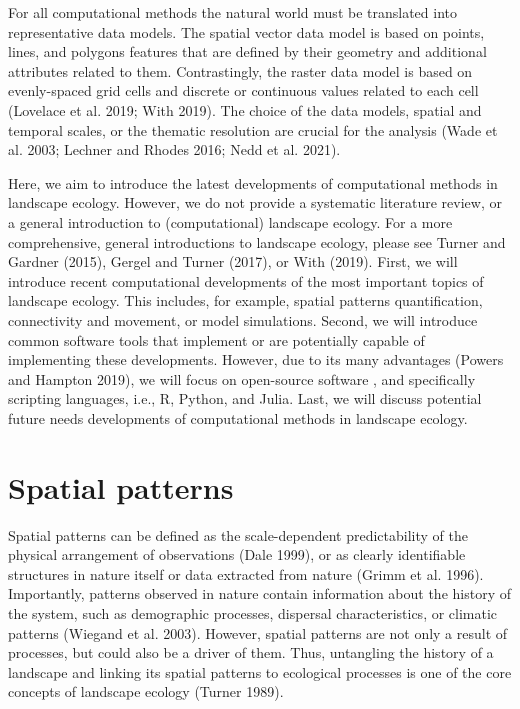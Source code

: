 \documentclass[
  10pt,
  a4paperpaper,
]{article}
\begin{document}
For all computational methods the natural world must be translated into
representative data models. The spatial vector data model is based on
points, lines, and polygons features that are defined by their geometry
and additional attributes related to them. Contrastingly, the raster
data model is based on evenly-spaced grid cells and discrete or
continuous values related to each cell (Lovelace et al. 2019; With
2019). The choice of the data models, spatial and temporal scales, or
the thematic resolution are crucial for the analysis (Wade et al. 2003;
Lechner and Rhodes 2016; Nedd et al. 2021).

Here, we aim to introduce the latest developments of computational
methods in landscape ecology. However, we do not provide a systematic
literature review, or a general introduction to (computational)
landscape ecology. For a more comprehensive, general introductions to
landscape ecology, please see Turner and Gardner (2015), Gergel and
Turner (2017), or With (2019). First, we will introduce recent
computational developments of the most important topics of landscape
ecology. This includes, for example, spatial patterns quantification,
connectivity and movement, or model simulations. Second, we will
introduce common software tools that implement or are potentially
capable of implementing these developments. However, due to its many
advantages (Powers and Hampton 2019), we will focus on open-source
software , and specifically scripting languages, i.e., R, Python, and
Julia. Last, we will discuss potential future needs developments of
computational methods in landscape ecology.

\section{Spatial patterns}\label{spatial-patterns}

Spatial patterns can be defined as the scale-dependent predictability of
the physical arrangement of observations (Dale 1999), or as clearly
identifiable structures in nature itself or data extracted from nature
(Grimm et al. 1996). Importantly, patterns observed in nature contain
information about the history of the system, such as demographic
processes, dispersal characteristics, or climatic patterns (Wiegand et
al. 2003). However, spatial patterns are not only a result of processes,
but could also be a driver of them. Thus, untangling the history of a
landscape and linking its spatial patterns to ecological processes is
one of the core concepts of landscape ecology (Turner 1989).
\end{document}
